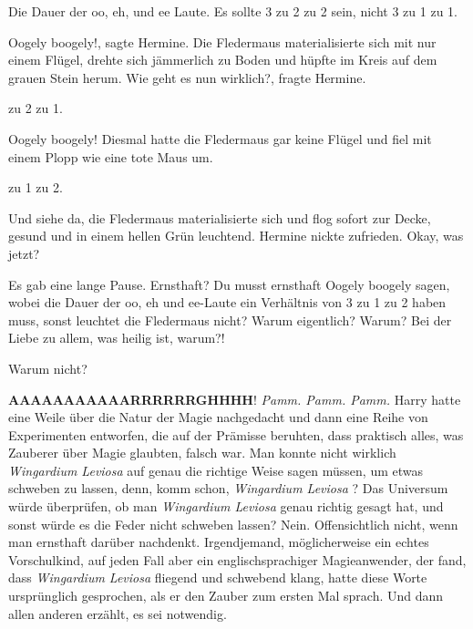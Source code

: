 \glqq Die Dauer der oo, eh, und ee Laute. Es sollte 3 zu 2 zu 2 sein, nicht 3 zu
1 zu 1.\grqq{}

\glqq Oogely boogely!\grqq{}, sagte Hermine. Die Fledermaus materialisierte sich
mit nur einem Flügel, drehte sich jämmerlich zu Boden und hüpfte im Kreis auf
dem grauen Stein herum. \glqq Wie geht es nun wirklich?\grqq{}, fragte Hermine.

 zu 2 zu 1.\grqq{}

\glqq Oogely boogely!\grqq{} Diesmal hatte die Fledermaus gar keine Flügel und
fiel mit einem Plopp wie eine tote Maus um.

 zu 1 zu 2.\grqq{}

Und siehe da, die Fledermaus materialisierte sich und flog sofort zur Decke,
gesund und in einem hellen Grün leuchtend. Hermine nickte zufrieden. \glqq Okay,
was jetzt?\grqq{}

Es gab eine lange Pause. \glqq Ernsthaft? Du musst ernsthaft Oogely boogely
sagen, wobei die Dauer der oo, eh und ee-Laute ein Verhältnis von 3 zu 1 zu 2
haben muss, sonst leuchtet die Fledermaus nicht? Warum eigentlich? Warum? Bei
der Liebe zu allem, was heilig ist, warum?!\grqq{}

\glqq Warum nicht?\grqq{}

\glqq \textbf{AAAAAAAAAAARRRRRRGHHHH}!\grqq{} \emph{Pamm. Pamm. Pamm.} Harry
hatte eine Weile über die Natur der Magie nachgedacht und dann eine Reihe von
Experimenten entworfen, die auf der Prämisse beruhten, dass praktisch alles, was
Zauberer über Magie glaubten, falsch war. Man konnte nicht wirklich \emph{\glqq
Wingardium Leviosa\grqq{} } auf genau die richtige Weise sagen müssen, um etwas
schweben zu lassen, denn, komm schon, \emph{\glqq Wingardium Leviosa\grqq{} }?
Das Universum würde überprüfen, ob man \emph{\glqq Wingardium Leviosa\grqq{} }
genau richtig gesagt hat, und sonst würde es die Feder nicht schweben lassen?
Nein. Offensichtlich nicht, wenn man ernsthaft darüber nachdenkt. Irgendjemand,
möglicherweise ein echtes Vorschulkind, auf jeden Fall aber ein
englischsprachiger Magieanwender, der fand, dass \emph{\glqq Wingardium
Leviosa\grqq{} } fliegend und schwebend klang, hatte diese Worte ursprünglich
gesprochen, als er den Zauber zum ersten Mal sprach. Und dann allen anderen
erzählt, es sei notwendig.

